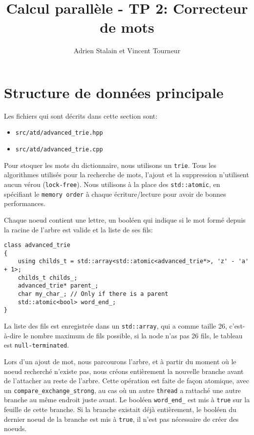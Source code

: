 \documentclass{article}
\title{Calcul parallèle - TP 2: Correcteur de mots}
\author{Adrien Stalain et Vincent Tourneur}
\begin{document}
\maketitle

\section{Structure de données principale}

Les fichiers qui sont décrits dans cette section sont:
\begin{itemize}
	\item \texttt{src/atd/advanced\_trie.hpp}
	\item \texttt{src/atd/advanced\_trie.cpp}
\end{itemize}

Pour stoquer les mots du dictionnaire, nous utilisons un \texttt{trie}. Tous
les algorithmes utilisés pour la recherche de mots, l'ajout et la suppression
n'utilisent aucun vérou (\texttt{lock-free}). Nous utilisons à la place des
\texttt{std::atomic}, en spécifiant le \texttt{memory order} à chaque
écriture/lecture pour avoir de bonnes performances.

Chaque noeud contient une lettre, un booléen qui indique si le mot formé depuis
la racine de l'arbre est valide et la liste de ses fils:
\begin{verbatim}
class advanced_trie
{
	using childs_t = std::array<std::atomic<advanced_trie*>, 'z' - 'a' + 1>;
	childs_t childs_;
	advanced_trie* parent_;
	char my_char_; // Only if there is a parent
	std::atomic<bool> word_end_;
}
\end{verbatim}

La liste des fils est enregistrée dans un \texttt{std::array}, qui a comme
taille 26, c'est-à-dire le nombre maximum de fils possible, si la node n'as pas 
26 fils, le tableau est \texttt{null-terminated}.

Lors d'un ajout de mot, nous parcourons l'arbre, et à partir du moment où le
noeud recherché n'existe pas, nous créons entièrement la nouvelle branche avant
de l'attacher au reste de l'arbre. Cette opération est faite de façon atomique,
avec un \texttt{compare\_exchange\_strong}, au cas où un autre \texttt{thread}
a rattaché une autre branche au même endroit juste avant. Le booléen
\texttt{word\_end\_} est mis à \texttt{true} sur la feuille de cette branche.
Si la branche existait déjà entièrement, le booléen du dernier noeud de la branche
est mis à \texttt{true}, il n'est pas nécessaire de créer des noeuds.
\end{document}
